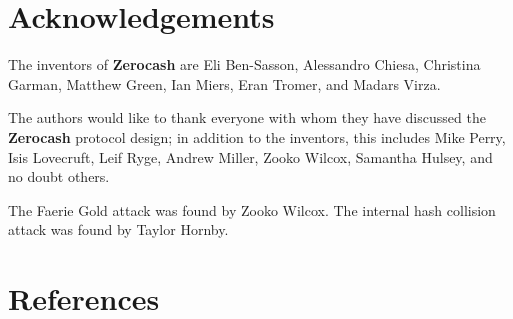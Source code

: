 \documentclass{article}
\newcommand{\termbf}[1]{\textbf{#1}\xspace}
\newcommand{\Zerocash}{\termbf{Zerocash}}
\begin{document}
\section{Acknowledgements}

The inventors of \Zerocash are Eli Ben-Sasson, Alessandro Chiesa,
Christina Garman, Matthew Green, Ian Miers, Eran Tromer, and Madars
Virza.

The authors would like to thank everyone with whom they have discussed
the \Zerocash protocol design; in addition to the inventors, this includes
Mike Perry, Isis Lovecruft, Leif Ryge, Andrew Miller, Zooko Wilcox,
Samantha Hulsey, and no doubt others.

The Faerie Gold attack was found by Zooko Wilcox.
The internal hash collision attack was found by Taylor Hornby.


\section{References}

\begingroup
\renewcommand{\section}[2]{}


\endgroup
\end{document}
